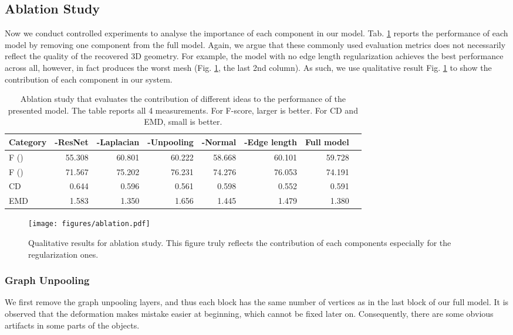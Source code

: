 \documentclass[runningheads]{llncs}
\newcommand{\figref}[1]{Fig. \ref{#1}}
\newcommand{\tabref}[1]{Tab. \ref{#1}}
\begin{document}
\subsection{Ablation Study} 
Now we conduct controlled experiments to analyse the importance of each component in our model. \tabref{tab:ablation} reports the performance of each model by removing one component from the full model. Again, we argue that these commonly used evaluation metrics does not necessarily reflect the quality of the recovered 3D geometry.
For example, the model with no edge length regularization achieves the best performance across all, however, in fact produces the worst mesh (\figref{fig:ablation}, the last 2nd column). As such, we use qualitative result \figref{fig:ablation} to show the contribution of each component in our system.



\begin{table}[t]
\centering
\setlength{\tabcolsep}{0.95mm}
\renewcommand{\arraystretch}{1.2}
\small
\begin{tabular}{@{}lrrrrrrr@{}}
\hline
Category & -ResNet & -Laplacian & -Unpooling & -Normal & -Edge length & Full model\\
\hline
\hline
F () & 55.308 & 60.801 & 60.222 & 58.668 & 60.101 & 59.728 \\
F () & 71.567 & 75.202 & 76.231 & 74.276 & 76.053 & 74.191 \\
CD & 0.644 & 0.596 & 0.561 & 0.598 & 0.552 & 0.591 \\
EMD & 1.583 & 1.350 & 1.656 & 1.445 & 1.479 & 1.380 \\
\hline
\end{tabular}
\caption{Ablation study that evaluates the contribution of different ideas to the performance of the presented model. The table reports all 4 measurements. For F-score, larger is better. For CD and EMD, small is better. }
\label{tab:ablation}
\end{table}

\begin{figure}[tbhp]
\centering
\texttt{[image: figures/ablation.pdf]}
\caption{Qualitative results for ablation study. This figure truly reflects the contribution of each components especially for the regularization ones.}
\label{fig:ablation}
\end{figure}

\subsubsection{Graph Unpooling}
We first remove the graph unpooling layers, and thus each block has the same number of vertices as in the last block of our full model. It is observed that the deformation makes mistake easier at beginning, which cannot be fixed later on. Consequently, there are some obvious artifacts in some parts of the objects.
\end{document}
